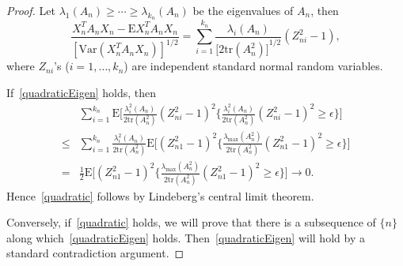 \documentclass[review]{elsarticle}
\theoremstyle{plain}
\theoremstyle{definition}
\theoremstyle{remark}
\begin{document}
\begin{proof}
    Let $\lambda_1(A_n)\geq\cdots\geq \lambda_{k_n}(A_n)$ be the eigenvalues of $A_n$, then 
    \begin{equation}
        \frac{X_n^T A_n X_n-\mathrm{E}X_n^T A_n X_n}{{[\mathrm{Var}(X_n^T A_n X_n)]}^{1/2}}=\sum_{i=1}^{k_n}\frac{\lambda_i(A_n)}{{\big[2\mathrm{tr}(A_n^2)\big]}^{1/2}}(Z_{ni}^2-1),
    \end{equation}
    where $Z_{ni}$'s ($i=1,\ldots,k_n$) are independent standard normal random variables.

    If~\ref{quadraticEigen} holds, then
    \begin{equation*}
        \begin{aligned}
            &\sum_{i=1}^{k_n}\mathrm{E}\Big[\frac{\lambda_i^2(A_n)}{2\mathrm{tr}(A_n^2)}{(Z_{ni}^2-1)}^2\Big\{\frac{\lambda_i^2(A_n)}{2\mathrm{tr}(A_n^2)}{(Z_{ni}^2-1)}^2\geq \epsilon\Big\}\Big]\\
            \leq&\sum_{i=1}^{k_n}
            \frac{\lambda_i^2(A_n)}{2\mathrm{tr}(A_n^2)}
            \mathrm{E}\Big[{(Z_{n1}^2-1)}^2\Big\{\frac{\lambda_{\max}(A_n^2)}{2\mathrm{tr}(A_n^2)}{(Z_{n1}^2-1)}^2\geq \epsilon\Big\}\Big]\\
            =&
            \frac{1}{2}\mathrm{E}\Big[{(Z_{n1}^2-1)}^2\Big\{\frac{\lambda_{\max}(A_n^2)}{2\mathrm{tr}(A_n^2)}{(Z_{n1}^2-1)}^2\geq \epsilon\Big\}\Big]\to 0.
        \end{aligned}
    \end{equation*}
    Hence~\ref{quadratic} follows by Lindeberg's central limit theorem.

    Conversely, if~\ref{quadratic} holds, we will prove that there is a subsequence of $\{n\}$ along which~\ref{quadraticEigen} holds. Then~\ref{quadraticEigen} will hold by a standard contradiction argument. 


\end{proof}
\end{document}
